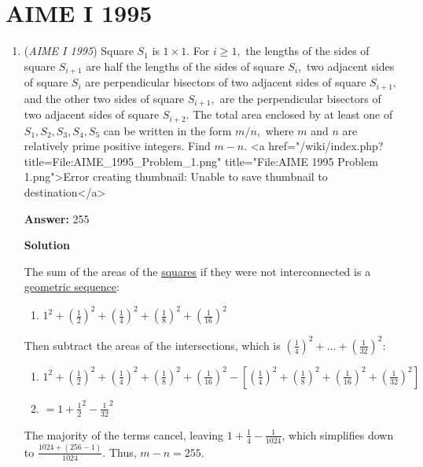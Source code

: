 \section{AIME I 1995}
        \begin{enumerate}
        	\item (\textit{AIME I 1995}) Square $S_{1}$ is $1\times 1.$  For $i\ge 1,$ the lengths of the sides of square $S_{i+1}$ are half the lengths of the sides of square $S_{i},$ two adjacent sides of square $S_{i}$ are perpendicular bisectors of two adjacent sides of square $S_{i+1},$ and the other two sides of square $S_{i+1},$ are the perpendicular bisectors of two adjacent sides of square $S_{i+2}.$  The total area enclosed by at least one of $S_{1}, S_{2}, S_{3}, S_{4}, S_{5}$ can be written in the form $m/n,$ where $m$ and $n$ are relatively prime positive integers.  Find $m-n.$
<a href="/wiki/index.php?title=File:AIME\_1995\_Problem\_1.png" title="File:AIME 1995 Problem 1.png">Error creating thumbnail: Unable to save thumbnail to destination</a>

 \textbf{Answer: }255



\textbf{Solution}

The sum of the areas of the \href{https://artofproblemsolving.com/wiki/index.php?title=Square}{squares} if they were not interconnected is a \href{https://artofproblemsolving.com/wiki/index.php?title=Geometric\_sequence}{geometric sequence}: 

 
            \begin{enumerate}[label=(\roman*)]
                \item $1^2 + \left(\frac{1}{2}\right)^2 + \left(\frac{1}{4}\right)^2 + \left(\frac{1}{8}\right)^2 + \left(\frac{1}{16}\right)^2$
            \end{enumerate}
            Then subtract the areas of the intersections, which is $\left(\frac{1}{4}\right)^2 + \ldots + \left(\frac{1}{32}\right)^2$:

 
            \begin{enumerate}[label=(\roman*)]
                \item $1^2 + \left(\frac{1}{2}\right)^2 + \left(\frac{1}{4}\right)^2 + \left(\frac{1}{8}\right)^2 + \left(\frac{1}{16}\right)^2 - \left[\left(\frac{1}{4}\right)^2 + \left(\frac{1}{8}\right)^2 + \left(\frac{1}{16}\right)^2 + \left(\frac{1}{32}\right)^2\right]$\item $= 1 + \frac{1}{2}^2 - \frac{1}{32}^2$
            \end{enumerate}
            The majority of the terms cancel, leaving $1 + \frac{1}{4} - \frac{1}{1024}$, which simplifies down to $\frac{1024 + \left(256 - 1\right)}{1024}$. Thus, $m-n =  \boxed{255}$.


\end{enumerate}
